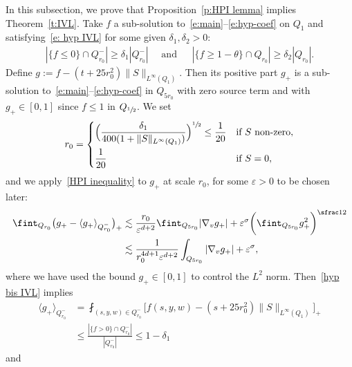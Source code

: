 \documentclass[JEP,XML,SOM,Unicode,NoFloatCountersInSection,published]{cedram}
\theoremstyle{definition}
\theoremstyle{remark}
\let\var\varepsilon
\begin{document}
In this subsection, we prove that Proposition~\ref{p:HPI lemma}
implies Theorem~\ref{t:IVL}. Take $f$ a sub-solution
to~\eqref{e:main}--\eqref{e:hyp-coef} on $Q_1$ and
satisfying~\eqref{e: hyp IVL} for some given
$\delta_1,\delta_2>0$:\vspace*{-3pt}
\begin{align}
\label{hyp bis IVL}
|\{f\leq 0\}\cap Q_{r_0}^{-}| \geq \delta_1 |Q_{r_0}^{-}|
\quad \text{ and }\ \quad
|\{f\geq 1-\theta\} \cap Q_{r_0}| \geq \delta_2 |Q_{r_0}|.
\end{align}
Define $g:=f-(t+25r_0^2) \|S\|_{L^\infty(Q_1)}$. Then its
positive part $g_+$ is a sub-solution
to~\eqref{e:main}--\eqref{e:hyp-coef} in $Q_{5r_0}$ with zero
source term and with $g_+ \in [0,1]$ since $f\le 1$ in
$Q_{\sfrac{1}{2}}$. We set\vspace*{-3pt}
\[
r_0 = \begin{dcases}
\Bigl(\dfrac{\delta_1}{400
(1+\|S\|_{L^\infty(Q_1)})}\Bigr)^{\sfrac12} \leq
\dfrac{1}{20}&\text{if $S$ non-zero},\\
\dfrac{1}{20}&\text{if $S=0$},
\end{dcases}
\]
and we apply~\eqref{HPI inequality} to $g_+$ at scale $r_0$, for
some $\var>0$ to be chosen later:\vspace*{-3pt}
\begin{equation}\label{Poinc in proof}
\begin{aligned}
\fint_{Q_{r_0}} \bigl(g_+-\langle
g_+\rangle_{Q_{r_0}^{-}}\bigr)_{+}
& \lesssim
\frac{r_0}{\varepsilon^{d+2}} \fint_{Q_{5r_0}} |\nabla_v g_+|
+ \var^\sigma \biggl( \fint_{Q_{5r_0}} g_+^2 \biggr)^{\sfrac12}\\
& \lesssim
\frac{1}{r_0^{4d+1} \varepsilon^{d+2}} \int_{Q_{5r_0}} |\nabla_v g_+|
+ \var^\sigma,
\end{aligned}
\end{equation}
where we have used the bound $g_+ \in [0,1]$ to control the $L^2$
norm. Then~\eqref{hyp bis IVL} implies\vspace*{-3pt}
\begin{equation}
\begin{aligned}
\label{estim averag}
\langle g_+\rangle_{Q_{r_0}^{-}} &= \fint_{(s,y,w) \in
Q_{r_0}^-} \big[f(s,y,w) - (s+25r_0^2) \| S \|_{L^\infty(Q_1)}\big]_+\\
&\leq \frac{\left|{\{f>0\}\cap Q_{r_0}^-}\right|}{|Q^{-}_{r_0}|}
\leq 1-\delta_1
\end{aligned}
\end{equation}
and\vspace*{-3pt}
\end{document}
